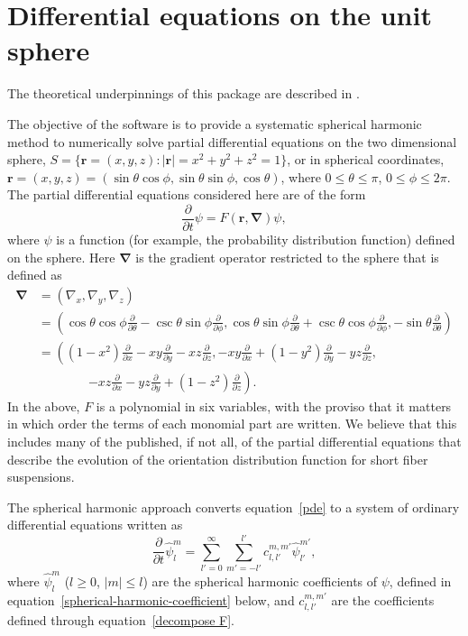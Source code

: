 \documentclass{amsart}
\newcommand\br{{\mathbf r}}
\newcommand\bnabla{{\boldsymbol \nabla}}
\begin{document}
\section{Differential equations on the unit sphere}

The theoretical underpinnings of this package are described in \cite{montgomerysmith:10}.

The objective of the software is to provide a systematic spherical harmonic method to numerically solve partial differential equations on the two
dimensional sphere, $S = \{\br = (x,y,z):|\br| = x^2+y^2+z^2 = 1\}$, or in spherical coordinates, $\br = (x,y,z) = (\sin\theta
\cos\phi,\sin\theta\sin\phi,\cos\theta)$, where $0\le\theta\le\pi$, $0\le\phi\le2\pi$.  The partial differential equations considered here are of the
form
\begin{equation}
\label{pde}
\frac\partial{\partial t}\psi = F(\br,\bnabla) \psi,
\end{equation}
where $\psi$ is a function (for example, the probability distribution function) defined on the sphere. Here $\bnabla$ is the gradient operator
restricted to the sphere that is defined as
\begin{equation}
\begin{split}
\bnabla &= (\nabla_x,\nabla_y,\nabla_z) \\
&= \left(\cos\theta\cos\phi\frac{\partial}{\partial\theta} - \csc\theta\sin\phi \frac{\partial}{\partial\phi},\cos\theta\sin\phi\frac{\partial}{\partial\theta} + \csc\theta\cos\phi \frac{\partial}{\partial\phi},-\sin\theta\frac{\partial}{\partial\theta} \right) \\
&= \left((1-x^2)\frac\partial{\partial x}-xy\frac\partial{\partial y}-xz\frac\partial{\partial z},
         -xy\frac\partial{\partial x}+(1-y^2)\frac\partial{\partial y}-yz\frac\partial{\partial z},\right.\\
&\qquad\qquad\left.
         -xz\frac\partial{\partial x}-yz\frac\partial{\partial y}+(1-z^2)\frac\partial{\partial
         z}\right) .
\end{split}
\end{equation}
In the above, $F$ is a polynomial in six variables, with the proviso that it matters in which order the terms of each monomial part are written. We
believe that this includes many of the published, if not all, of the partial differential equations that describe the evolution of
the orientation distribution function for short fiber suspensions.

The spherical harmonic approach converts equation~\eqref{pde} to a
system of ordinary differential equations written as
\begin{equation}
\label{spherical-pde}
\frac\partial{\partial t} \hat\psi_l^m = \sum_{l'=0}^\infty \sum_{m'=-l'}^{l'} c_{l,l'}^{m,m'} \hat\psi_{l'}^{m'} ,
\end{equation}
where $\hat\psi_l^m$ ($l \ge 0$, $|m| \le l$) are the spherical harmonic coefficients of $\psi$, defined in
equation~\eqref{spherical-harmonic-coefficient} below, and $c_{l,l'}^{m,m'}$ are the coefficients defined through equation~\eqref{decompose F}.
\end{document}
